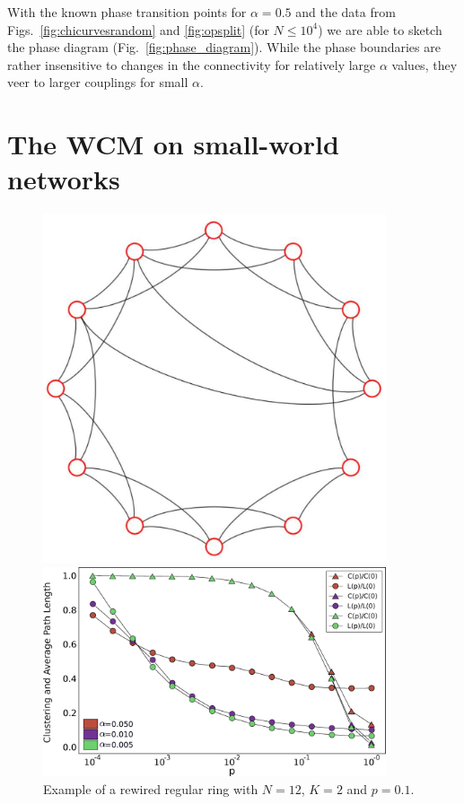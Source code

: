 With the known phase transition points for $\alpha=0.5$ and the data from Figs.~\ref{fig:chicurvesrandom} and \ref{fig:opsplit} (for $N
\leq 10^4$) we are able to sketch the phase diagram (Fig.~\ref{fig:phase_diagram}). While the phase boundaries are rather insensitive
to changes in the connectivity for relatively large $\alpha$ values, they veer to larger couplings for small $\alpha$.


\section{\label{smallworld} The WCM on small-world networks}


\begin{figure}[b]
    \centering
    \begin{minipage}[t]{0.33\textwidth}
        \centering
        \includegraphics[width=0.9\textwidth]{fig/rewiredring.eps}
        \caption{\label{fig:rewiredring} Example of a rewired regular ring with $N=12$, $K=2$ and $p=0.1$.  }
    \end{minipage}
    \hfill
    \begin{minipage}[t]{0.62\textwidth}
        \centering
        \includegraphics[width=0.9\textwidth]{fig/small-world.eps}

\end{minipage}
\end{figure}
